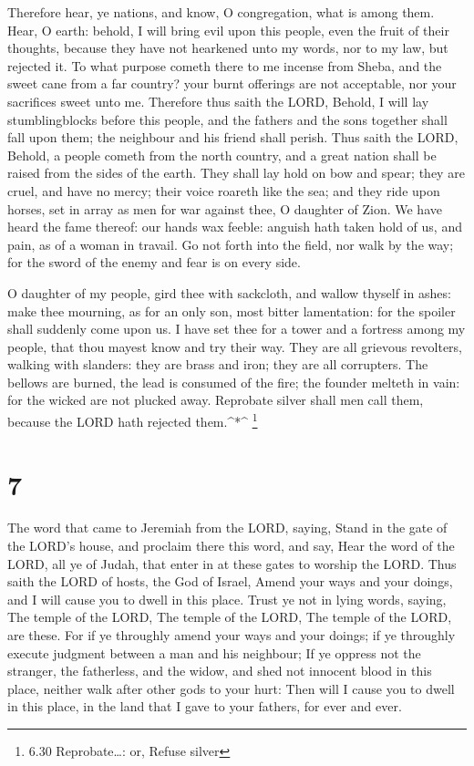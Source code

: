  Therefore hear, ye nations, and know, O congregation, what
is among them.  Hear, O earth: behold, I will bring evil
upon this people, even the fruit of their thoughts, because they have
not hearkened unto my words, nor to my law, but rejected it.
 To what purpose cometh there to me incense from Sheba, and
the sweet cane from a far country? your burnt offerings are not
acceptable, nor your sacrifices sweet unto me.  Therefore
thus saith the LORD, Behold, I will lay stumblingblocks before this
people, and the fathers and the sons together shall fall upon them; the
neighbour and his friend shall perish.  Thus saith the
LORD, Behold, a people cometh from the north country, and a great nation
shall be raised from the sides of the earth.  They shall
lay hold on bow and spear; they are cruel, and have no mercy; their
voice roareth like the sea; and they ride upon horses, set in array as
men for war against thee, O daughter of Zion.  We have
heard the fame thereof: our hands wax feeble: anguish hath taken hold of
us, and pain, as of a woman in travail.  Go not forth into
the field, nor walk by the way; for the sword of the enemy and fear is
on every side.

 O daughter of my people, gird thee with sackcloth, and
wallow thyself in ashes: make thee mourning, as for an only son, most
bitter lamentation: for the spoiler shall suddenly come upon us.
 I have set thee for a tower and a fortress among my
people, that thou mayest know and try their way.  They are
all grievous revolters, walking with slanders: they are brass and iron;
they are all corrupters.  The bellows are burned, the lead
is consumed of the fire; the founder melteth in vain: for the wicked are
not plucked away.  Reprobate silver shall men call them,
because the LORD hath rejected them.\^{}*\^{} \footnote{6.30
  Reprobate\ldots: or, Refuse silver}

\hypertarget{section-6}{%
\section{7}\label{section-6}}

 The word that came to Jeremiah from the LORD, saying,
 Stand in the gate of the LORD's house, and proclaim there
this word, and say, Hear the word of the LORD, all ye of Judah, that
enter in at these gates to worship the LORD.  Thus saith the
LORD of hosts, the God of Israel, Amend your ways and your doings, and I
will cause you to dwell in this place.  Trust ye not in
lying words, saying, The temple of the LORD, The temple of the LORD, The
temple of the LORD, are these.  For if ye throughly amend
your ways and your doings; if ye throughly execute judgment between a
man and his neighbour;  If ye oppress not the stranger, the
fatherless, and the widow, and shed not innocent blood in this place,
neither walk after other gods to your hurt:  Then will I
cause you to dwell in this place, in the land that I gave to your
fathers, for ever and ever.

